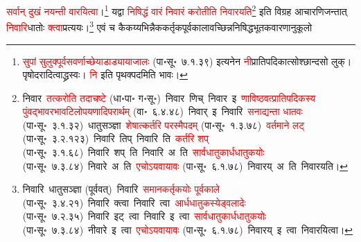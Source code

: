 \begin{sloppypar}
\textcolor{red}{सर्वान् दुखं नयन्ती वारयित्वा}।\footnote{\textcolor{red}{सुपां सुलुक्पूर्व\-सवर्णाच्छेयाडाड्यायाजालः} (पा॰सू॰~७.१.३९) इत्यनेन \textcolor{red}{नी}\-प्रातिपदिकात्सोश्छान्दसो लुक्। पृषोदरादित्वाद्ध्रस्वः। \textcolor{red}{नि} इति पृथक्पदमिति भावः।} यद्वा \textcolor{red}{निषिद्धं वारं निवारं करोतीति निवारयति}\footnote{निवार~\arrow \textcolor{red}{तत्करोति तदाचष्टे} (धा॰पा॰ ग॰सू॰)~\arrow निवार~णिच्~\arrow निवार~इ~\arrow \textcolor{red}{णाविष्ठवत्प्राति\-पदिकस्य पुंवद्भाव\-रभाव\-टिलोप\-यणादि\-परार्थम्} (वा॰~६.४.४८)~\arrow निवार्~इ~\arrow निवारि~\arrow \textcolor{red}{सनाद्यन्ता धातवः} (पा॰सू॰~३.१.३२)~\arrow धातु\-सञ्ज्ञा~\arrow \textcolor{red}{शेषात्कर्तरि परस्मैपदम्} (पा॰सू॰~१.३.७८)~\arrow \textcolor{red}{वर्तमाने लट्} (पा॰सू॰~३.२.१२३)~\arrow निवारि~तिप्~\arrow निवारि~ति~\arrow \textcolor{red}{कर्तरि शप्‌} (पा॰सू॰~३.१.६८)~\arrow निवारि~शप्~ति~\arrow निवारि~अ~ति~\arrow \textcolor{red}{सार्वधातुकार्ध\-धातुकयोः} (पा॰सू॰~७.३.८४)~\arrow निवारे~अ~ति~\arrow \textcolor{red}{एचोऽयवायावः} (पा॰सू॰~६.१.७८)~\arrow निवारय्~अ~ति~\arrow निवारयति।} इति विग्रह आचार\-णिजन्तात् \textcolor{red}{निवारि}\-धातोः \textcolor{red}{क्त्वा}\-प्रत्ययः।\footnote{निवारि~\arrow धातु\-सञ्ज्ञा (पूर्ववत्)~\arrow निवारि~\arrow \textcolor{red}{समान\-कर्तृकयोः पूर्व\-काले} (पा॰सू॰~३.४.२१)~\arrow निवारि~क्त्वा~\arrow निवारि~त्वा~\arrow \textcolor{red}{आर्धधातुकस्येड्वलादेः} (पा॰सू॰~७.२.३५)~\arrow निवारि~इट्~त्वा~\arrow निवारि~इ~त्वा~\arrow \textcolor{red}{सार्वधातुकार्ध\-धातुकयोः} (पा॰सू॰~७.३.८४)~\arrow नीवारे~इ~त्वा~\arrow \textcolor{red}{एचोऽयवायावः} (पा॰सू॰~६.१.७८)~\arrow निवारय्~इ~त्वा~\arrow निवारयित्वा।} एवं च कैकय्यभिन्नैक\-कर्तृक\-पूर्व\-कालावच्छिन्न\-निषिद्ध\-भूतक\-वारणानुकूलो

\end{sloppypar}
